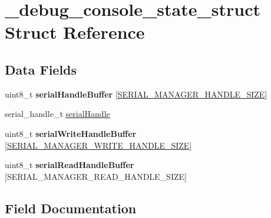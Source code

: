 \hypertarget{struct__debug__console__state__struct}{}\section{\+\_\+debug\+\_\+console\+\_\+state\+\_\+struct Struct Reference}
\label{struct__debug__console__state__struct}
\subsection*{Data Fields}
\begin{DoxyCompactItemize}
\item 
\mbox{\label{struct__debug__console__state__struct_a688f09e591b8765db93f3394ac1da3db}} 
uint8\+\_\+t {\bfseries serial\+Handle\+Buffer} \mbox{[}\mbox{\hyperlink{group__serialmanager_gabc4aa7ae83c31b66e437d7fd264aaebc}{S\+E\+R\+I\+A\+L\+\_\+\+M\+A\+N\+A\+G\+E\+R\+\_\+\+H\+A\+N\+D\+L\+E\+\_\+\+S\+I\+ZE}}\mbox{]}
\item 
serial\+\_\+handle\+\_\+t \mbox{\hyperlink{struct__debug__console__state__struct_a68cbbaa7bf720445e66d5b5dbdd787e3}{serial\+Handle}}
\item 
\mbox{\label{struct__debug__console__state__struct_a856379feb95979aef85c95ccd40d0c07}} 
uint8\+\_\+t {\bfseries serial\+Write\+Handle\+Buffer} \mbox{[}\mbox{\hyperlink{group__serialmanager_gac278be51c3508495c1be1a4cff566f3f}{S\+E\+R\+I\+A\+L\+\_\+\+M\+A\+N\+A\+G\+E\+R\+\_\+\+W\+R\+I\+T\+E\+\_\+\+H\+A\+N\+D\+L\+E\+\_\+\+S\+I\+ZE}}\mbox{]}
\item 
\mbox{\label{struct__debug__console__state__struct_a54fa5f27ef2409352656d44f167a9213}} 
uint8\+\_\+t {\bfseries serial\+Read\+Handle\+Buffer} \mbox{[}S\+E\+R\+I\+A\+L\+\_\+\+M\+A\+N\+A\+G\+E\+R\+\_\+\+R\+E\+A\+D\+\_\+\+H\+A\+N\+D\+L\+E\+\_\+\+S\+I\+ZE\mbox{]}
\end{DoxyCompactItemize}


\subsection{Field Documentation}
\mbox{\label{struct__debug__console__state__struct_a68cbbaa7bf720445e66d5b5dbdd787e3}} 
